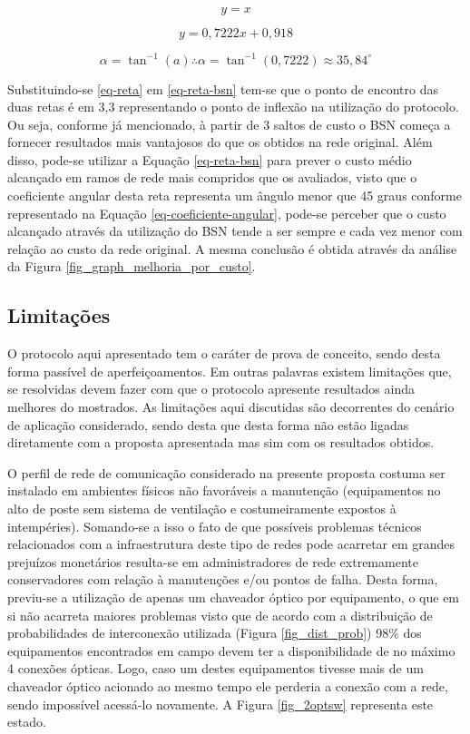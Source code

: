 \begin{equation}
y = x
\label{eq-reta}
\end{equation}

\begin{equation}
y = 0,7222x + 0,918
\label{eq-reta-bsn}
\end{equation}

\begin{equation}
\alpha = \tan ^{-1}(a)\therefore \alpha =\tan ^{-1}(0,7222)\approx 35,84^{\circ}
\label{eq-coeficiente-angular}
\end{equation}

Substituindo-se \ref{eq-reta} em \ref{eq-reta-bsn} tem-se que o ponto de encontro das duas retas é em 3,3 representando o ponto de inflexão na utilização do protocolo. Ou seja, conforme já mencionado, à partir de 3 saltos de custo o BSN começa a fornecer resultados mais vantajosos do que os obtidos na rede original. Além disso, pode-se utilizar a Equação \ref{eq-reta-bsn} para prever o custo médio alcançado em ramos de rede mais compridos que os avaliados, visto que o coeficiente angular desta reta representa um ângulo menor que 45 graus conforme representado na Equação \ref{eq-coeficiente-angular}, pode-se perceber que o custo alcançado através da utilização do BSN tende a ser sempre e cada vez menor com relação ao custo da rede original. A mesma conclusão é obtida através da análise da Figura \ref{fig_graph_melhoria_por_custo}.

\subsection{Limitações}
O protocolo aqui apresentado tem o caráter de prova de conceito, sendo desta forma passível de aperfeiçoamentos. Em outras palavras existem limitações que, se resolvidas devem fazer com que o protocolo apresente resultados ainda melhores do mostrados. As limitações aqui discutidas são decorrentes do cenário de aplicação considerado, sendo desta que desta forma não estão ligadas diretamente com a proposta apresentada mas sim com os resultados obtidos.

O perfil de rede de comunicação considerado na presente proposta costuma ser instalado em ambientes físicos não favoráveis a manutenção (equipamentos no alto de poste sem sistema de ventilação e costumeiramente expostos à intempéries). Somando-se a isso o fato de que possíveis problemas técnicos relacionados com a infraestrutura deste tipo de redes pode acarretar em grandes prejuízos monetários resulta-se em administradores de rede extremamente conservadores com relação à manutenções e/ou pontos de falha. Desta forma, previu-se a utilização de apenas um chaveador óptico por equipamento, o que em si não acarreta maiores problemas visto que de acordo com a distribuição de probabilidades de interconexão utilizada (Figura \ref{fig_dist_prob}) 98\% dos equipamentos encontrados em campo devem ter a disponibilidade de no máximo 4 conexões ópticas. Logo, caso um destes equipamentos tivesse mais de um chaveador óptico acionado ao mesmo tempo ele perderia a conexão com a rede, sendo impossível acessá-lo novamente. A Figura \ref{fig_2optsw} representa este estado.

